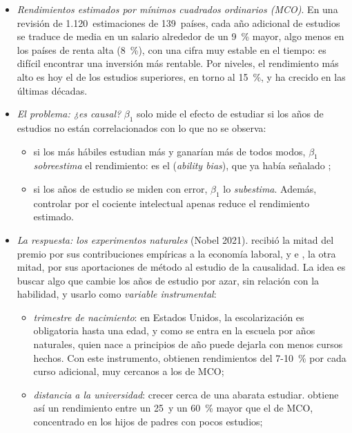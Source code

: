 \documentclass[11pt]{article}
\begin{document}
\begin{itemize}
\item \emph{Rendimientos estimados por mínimos cuadrados ordinarios (MCO)}. En una revisión de 1.120~estimaciones de 139~países, cada año adicional de estudios se traduce de media en un salario alrededor de un 9~\% mayor, algo menos en los países de renta alta (8~\%), con una cifra muy estable en el tiempo\nocite{PsacharopoulosPatrinos2018Returns}: es difícil encontrar una inversión más rentable. Por niveles, el rendimiento más alto es hoy el de los estudios superiores, en torno al 15~\%\nocite{MontenegroPatrinos2014Comparable}, y ha crecido en las últimas décadas.
\item \emph{El problema: ¿es causal?} $\beta_1$ solo mide el efecto de estudiar si los años de estudios no están correlacionados con lo que no se observa:
  \begin{itemize}
  \item si los más hábiles estudian más y ganarían más de todos modos, $\beta_1$ \emph{sobreestima} el rendimiento: es el  (\emph{ability bias}), que ya había señalado ;
  \item si los años de estudio se miden con error, $\beta_1$ lo \emph{subestima}. Además, controlar por el cociente intelectual apenas reduce el rendimiento estimado\nocite{Griliches1977Estimating}.
  \end{itemize}
\item \emph{La respuesta: los experimentos naturales} (Nobel 2021).  recibió la mitad del premio por sus contribuciones empíricas a la economía laboral, y  e , la otra mitad, por sus aportaciones de método al estudio de la causalidad\nocite{Nobel2021}. La idea es buscar algo que cambie los años de estudio por azar, sin relación con la habilidad, y usarlo como \emph{variable instrumental}:
  \begin{itemize}
  \item \emph{trimestre de nacimiento}: en Estados Unidos, la escolarización es obligatoria hasta una edad, y como se entra en la escuela por años naturales, quien nace a principios de año puede dejarla con menos cursos hechos. Con este instrumento, \textcite{AngristKrueger1991Does} obtienen rendimientos del 7-10~\% por cada curso adicional, muy cercanos a los de MCO;
  \item \emph{distancia a la universidad}: crecer cerca de una abarata estudiar. \textcite{Card1995Using} obtiene así un rendimiento entre un 25~y un 60~\% mayor que el de MCO, concentrado en los hijos de padres con pocos estudios;

\end{itemize}
\end{itemize}
\end{document}
